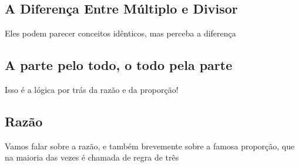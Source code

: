 \documentclass{article}
\begin{document}
\subsection{A Diferença Entre Múltiplo e Divisor}
Eles podem parecer conceitos idênticos, mas perceba a diferença

\subsection{A parte pelo todo, o todo pela parte}
Isso é a lógica por trás da razão e da proporção!

\subsection{Razão}
Vamos falar sobre a razão, e também brevemente sobre a famosa proporção, que na maioria das vezes é chamada de regra de três
\end{document}
